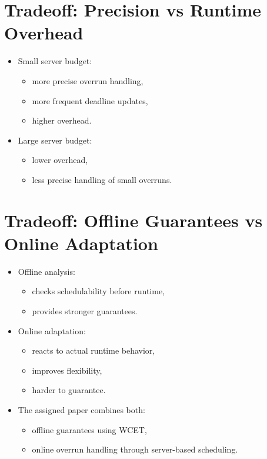 \documentclass[a4paper,11pt]{article}
\begin{document}
\section*{Tradeoff: Precision vs Runtime Overhead}

\begin{itemize}
    \item Small server budget:
    \begin{itemize}
        \item more precise overrun handling,
        \item more frequent deadline updates,
        \item higher overhead.
    \end{itemize}
    \item Large server budget:
    \begin{itemize}
        \item lower overhead,
        \item less precise handling of small overruns.
    \end{itemize}
\end{itemize}

\section*{Tradeoff: Offline Guarantees vs Online Adaptation}

\begin{itemize}
    \item Offline analysis:
    \begin{itemize}
        \item checks schedulability before runtime,
        \item provides stronger guarantees.
    \end{itemize}
    \item Online adaptation:
    \begin{itemize}
        \item reacts to actual runtime behavior,
        \item improves flexibility,
        \item harder to guarantee.
    \end{itemize}
    \item The assigned paper combines both:
    \begin{itemize}
        \item offline guarantees using WCET,
        \item online overrun handling through server-based scheduling.
    \end{itemize}
\end{itemize}
\end{document}

